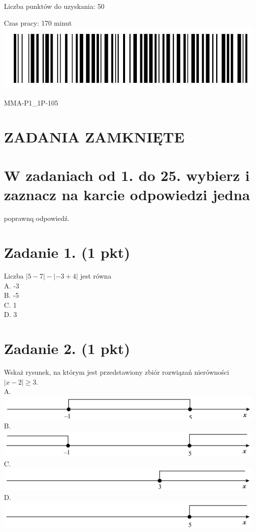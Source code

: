 \documentclass[10pt]{article}
\begin{document}
Liczba punktów do uzyskania: 50

Czas pracy: 170 minut\\
\includegraphics[max width=\textwidth, center]{2024_11_21_603d5c1b2a7d8d68f45fg-01}

MMA-P1\_1P-105

\section*{ZADANIA ZAMKNIĘTE}
\section*{W zadaniach od 1. do 25. wybierz i zaznacz na karcie odpowiedzi jedna}
poprawnq odpowiedź.

\section*{Zadanie 1. (1 pkt)}
Liczba \(|5-7|-|-3+4|\) jest równa\\
A. -3\\
B. -5\\
C. 1\\
D. 3

\section*{Zadanie 2. (1 pkt)}
Wskaż rysunek, na którym jest przedstawiony zbiór rozwiązań nierówności \(|x-2| \geq 3\).\\
A.\\
\includegraphics[max width=\textwidth, center]{2024_11_21_603d5c1b2a7d8d68f45fg-02(2)}\\
B.\\
\includegraphics[max width=\textwidth, center]{2024_11_21_603d5c1b2a7d8d68f45fg-02}\\
C.\\
\includegraphics[max width=\textwidth, center]{2024_11_21_603d5c1b2a7d8d68f45fg-02(1)}\\
D.\\
\includegraphics[max width=\textwidth, center]{2024_11_21_603d5c1b2a7d8d68f45fg-02(3)}
\end{document}
